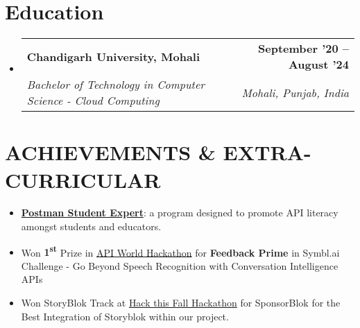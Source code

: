 \documentclass[letterpaper,11pt]{article}
\makeatletter
\newcommand{\achievementItem}[1]{
  \item\normalsize{
    {#1 \vspace{-6pt}}
  }
}
\newcommand{\resumeSubheading}[4]{
  \vspace{-2pt}\item
    \begin{tabular*}{1.0\textwidth}[t]{l@{\extracolsep{\fill}}r}
      \textbf{#1} & \textbf{\normalsize #2} \\
      \textit{\normalsize#3} & \textit{\normalsize #4} \\
    \end{tabular*}\vspace{-7pt}
}
\newcommand{\resumeSubHeadingListStart}{\begin{itemize}[leftmargin=0.0in, label={}]}
\newcommand{\resumeSubHeadingListEnd}{\end{itemize}}
\makeatother
\begin{document}
\section{Education}
  \resumeSubHeadingListStart
    \resumeSubheading
      {Chandigarh University, Mohali}{September '20 -- August '24}
      {Bachelor of Technology in Computer Science - Cloud Computing}{Mohali, Punjab, India}
  \resumeSubHeadingListEnd


\section{ACHIEVEMENTS \& EXTRA-CURRICULAR}

\begin{itemize}[leftmargin=0.2in]
  \achievementItem{\href{https://badgr.com/public/assertions/VVxNa822Quinhvm6DbWzoA}{\textbf{Postman Student Expert}}: a program designed to promote API literacy amongst students and educators.}
  \achievementItem{Won \textbf{1\textsuperscript{st}} Prize in \href{https://apiworld.co/hackathon}{API World Hackathon} for \textbf{Feedback Prime} in Symbl.ai Challenge - Go Beyond Speech Recognition with Conversation Intelligence APIs}
  \achievementItem{Won StoryBlok Track at \href{https://hackthisfall.tech/}{Hack this Fall Hackathon} for SponsorBlok for the Best Integration of Storyblok within our project. }
\end{itemize}
        
\end{document}
